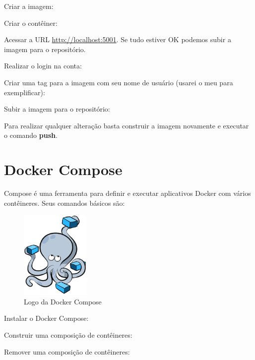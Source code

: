 \documentclass[a4paper,11pt]{article}
\begin{document}
Criar a imagem: \\

Criar o contêiner: \\

Acessar a URL \url{http://localhost:5001}. Se tudo estiver OK podemos subir a imagem para o repositório. 

Realizar o login na conta: \\

Criar uma tag para a imagem com seu nome de usuário (usarei o meu para exemplificar): \\

Subir a imagem para o repositório: \\

Para realizar qualquer alteração basta construir a imagem novamente e executar o comando \textbf{push}.

\section{Docker Compose}
Compose é uma ferramenta para definir e executar aplicativos Docker com vários contêineres. Seus comandos básicos são:
\begin{figure}[!htb]
	\centering
	\includegraphics[width=0.3\textwidth]{imagem/DockerCompose.png}
	\caption{Logo da Docker Compose}
\end{figure}

Instalar o Docker Compose: \\

Construir uma composição de contêineres: \\

Remover uma composição de contêineres: \\
\end{document}
